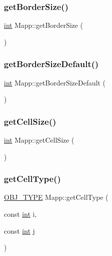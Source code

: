 \subsubsection{\texorpdfstring{getBorderSize()}{getBorderSize()}}
{\footnotesize\ttfamily \mbox{\hyperlink{draw_8hh_aa620a13339ac3a1177c86edc549fda9b}{int}} Mapp\+::get\+Border\+Size (\begin{DoxyParamCaption}{ }\end{DoxyParamCaption})\hspace{0.3cm}{\ttfamily [inline]}}

\mbox{\label{class_mapp_a2f867ee7600f6953cf7df1f61ea61290}} 
\subsubsection{\texorpdfstring{getBorderSizeDefault()}{getBorderSizeDefault()}}
{\footnotesize\ttfamily \mbox{\hyperlink{draw_8hh_aa620a13339ac3a1177c86edc549fda9b}{int}} Mapp\+::get\+Border\+Size\+Default (\begin{DoxyParamCaption}{ }\end{DoxyParamCaption})\hspace{0.3cm}{\ttfamily [inline]}}

\mbox{\label{class_mapp_a964609f3405a097bc0dbc6d4b8e19f47}} 
\subsubsection{\texorpdfstring{getCellSize()}{getCellSize()}}
{\footnotesize\ttfamily \mbox{\hyperlink{draw_8hh_aa620a13339ac3a1177c86edc549fda9b}{int}} Mapp\+::get\+Cell\+Size (\begin{DoxyParamCaption}{ }\end{DoxyParamCaption})\hspace{0.3cm}{\ttfamily [inline]}}

\mbox{\label{class_mapp_aba5cd0247782b0d06bc2bb7ff8ff93af}} 
\subsubsection{\texorpdfstring{getCellType()}{getCellType()}}
{\footnotesize\ttfamily \mbox{\hyperlink{map_8hh_a714b9c2c276fbae637fee36453d9121e}{O\+B\+J\+\_\+\+T\+Y\+PE}} Mapp\+::get\+Cell\+Type (\begin{DoxyParamCaption}\item[{const \mbox{\hyperlink{draw_8hh_aa620a13339ac3a1177c86edc549fda9b}{int}}}]{i,  }\item[{const \mbox{\hyperlink{draw_8hh_aa620a13339ac3a1177c86edc549fda9b}{int}}}]{j }\end{DoxyParamCaption})}



